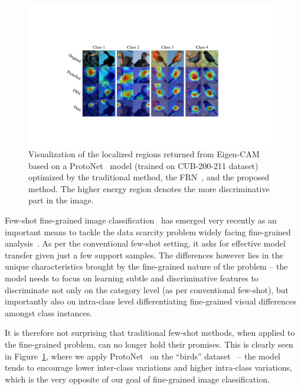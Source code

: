 \documentclass[letterpaper]{article} %
\begin{document}
\begin{figure}[!htp]
  \centering
  \includegraphics[width=0.85\linewidth]{figures/1.1.pdf}
  \caption{Visualization of the localized regions returned from Eigen-CAM~\cite{muhammad2020eigen} based on a ProtoNet~\cite{NIPS2017_cb8da676} model (trained on CUB-200-211 dataset) optimized by the traditional method, the FRN~\cite{Wertheimer_2021_CVPR}, and the proposed method. The higher energy region denotes the more discriminative part in the image.}
  \label{fig:1}
\end{figure}



Few-shot fine-grained image classification~\cite{Huang2021LowRankPA,9293172} has emerged very recently as an important means to tackle the data scarcity problem widely facing fine-grained analysis~\cite{3401454f29a841a29142c97833857e78}. As per the conventional few-shot setting, it asks for effective model transfer given just a few support samples. The differences however lies in the unique characteristics brought by the fine-grained nature of the problem -- the model needs to focus on learning subtle and discriminative features to discriminate not only on the category level (as per conventional few-shot), but importantly also on intra-class level differentiating fine-grained visual differences amongst class instances. 

It is therefore not surprising that traditional few-shot methods, when applied to the {fine-grained} problem, can no longer hold their promises. This is clearly seen in Figure~\ref{fig:1}, where we apply ProtoNet~\cite{NIPS2017_cb8da676} on the ``birds'' dataset~\cite{WelinderEtal2010} -- the model {tends to encourage} lower inter-class variations and higher intra-class variations, which is the very opposite of our goal of fine-grained image classification.
\end{document}
